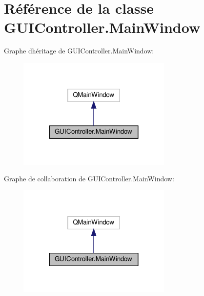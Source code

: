 \hypertarget{classGUIController_1_1MainWindow}{}\section{Référence de la classe G\+U\+I\+Controller.\+Main\+Window}
\label{classGUIController_1_1MainWindow}


Graphe d\textquotesingle{}héritage de G\+U\+I\+Controller.\+Main\+Window\+:
\nopagebreak
\begin{figure}[H]
\begin{center}
\leavevmode
\includegraphics[width=216pt]{classGUIController_1_1MainWindow__inherit__graph}
\end{center}
\end{figure}


Graphe de collaboration de G\+U\+I\+Controller.\+Main\+Window\+:
\nopagebreak
\begin{figure}[H]
\begin{center}
\leavevmode
\includegraphics[width=216pt]{classGUIController_1_1MainWindow__coll__graph}
\end{center}
\end{figure}

